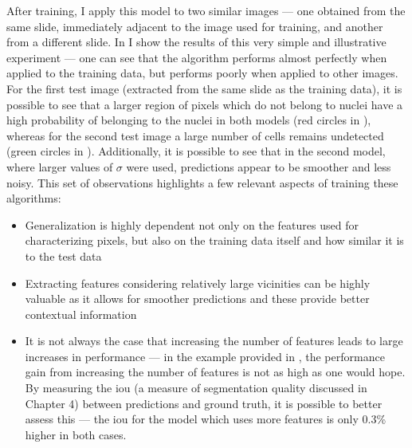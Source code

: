 After training, I apply this model to two similar images --- one obtained from the same slide, immediately adjacent to the image used for training, and another from a different slide. In  I show the results of this very simple and illustrative experiment --- one can see that the algorithm performs almost perfectly when applied to the training data, but performs poorly when applied to other images. For the first test image (extracted from the same slide as the training data), it is possible to see that a larger region of pixels which do not belong to nuclei have a high probability of belonging to the nuclei in both models (red circles in ), whereas for the second test image a large number of cells remains undetected (green circles in ). Additionally, it is possible to see that in the second model, where larger values of $\sigma$ were used, predictions appear to be smoother and less noisy. This set of observations highlights a few relevant aspects of training these algorithms:

\begin{itemize}
    \item Generalization is highly dependent not only on the features used for characterizing pixels, but also on the training data itself and how similar it is to the test data
    \item Extracting features considering relatively large vicinities can be highly valuable as it allows for smoother predictions and these provide better contextual information
    \item It is not always the case that increasing the number of features leads to large increases in performance --- in the example provided in , the performance gain from increasing the number of features is not as high as one would hope. By measuring the \ac{iou} (a measure of segmentation quality discussed in Chapter 4) between predictions and ground truth, it is possible to better assess this --- the \ac{iou} for the model which uses more features is only 0.3\% higher in both cases.
\end{itemize}

\begin{figure}[!ht]
	\label{fig:segmentation-example-result}
\end{figure}

